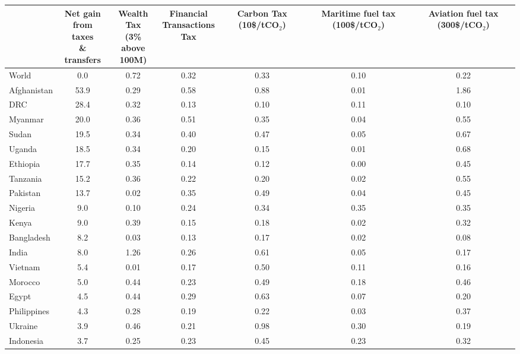 
\begin{tabular}[t]{lcccccc}
\toprule
  & \makecell{Net gain\\from taxes\\\& transfers} & \makecell{Wealth Tax\\(3\% above\\100M)} & \makecell{Financial\\Transactions\\Tax} & \makecell{Carbon\\Tax\\(10\$/tCO$_\text{2}$)} & \makecell{Maritime\\fuel tax\\(100\$/tCO$_\text{2}$)} & \makecell{Aviation\\fuel tax\\(300\$/tCO$_\text{2}$)}\\
\midrule
World & 0.0 & 0.72 & 0.32 & 0.33 & 0.10 & 0.22\\
Afghanistan & 53.9 & 0.29 & 0.58 & 0.88 & 0.01 & 1.86\\
DRC & 28.4 & 0.32 & 0.13 & 0.10 & 0.11 & 0.10\\
Myanmar & 20.0 & 0.36 & 0.51 & 0.35 & 0.04 & 0.55\\
Sudan & 19.5 & 0.34 & 0.40 & 0.47 & 0.05 & 0.67\\
Uganda & 18.5 & 0.34 & 0.20 & 0.15 & 0.01 & 0.68\\
Ethiopia & 17.7 & 0.35 & 0.14 & 0.12 & 0.00 & 0.45\\
Tanzania & 15.2 & 0.36 & 0.22 & 0.20 & 0.02 & 0.55\\
Pakistan & 13.7 & 0.02 & 0.35 & 0.49 & 0.04 & 0.45\\
Nigeria & 9.0 & 0.10 & 0.24 & 0.34 & 0.35 & 0.35\\
Kenya & 9.0 & 0.39 & 0.15 & 0.18 & 0.02 & 0.32\\
Bangladesh & 8.2 & 0.03 & 0.13 & 0.17 & 0.02 & 0.08\\
India & 8.0 & 1.26 & 0.26 & 0.61 & 0.05 & 0.17\\
Vietnam & 5.4 & 0.01 & 0.17 & 0.50 & 0.11 & 0.16\\
Morocco & 5.0 & 0.44 & 0.23 & 0.49 & 0.18 & 0.46\\
Egypt & 4.5 & 0.44 & 0.29 & 0.63 & 0.07 & 0.20\\
Philippines & 4.3 & 0.28 & 0.19 & 0.22 & 0.03 & 0.37\\
Ukraine & 3.9 & 0.46 & 0.21 & 0.98 & 0.30 & 0.19\\
Indonesia & 3.7 & 0.25 & 0.23 & 0.45 & 0.23 & 0.32\\

\end{tabular}
